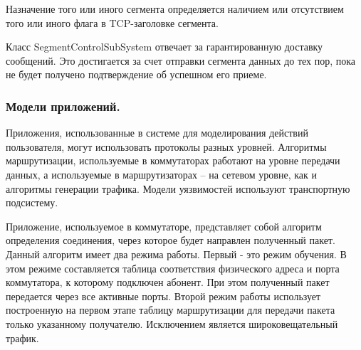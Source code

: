     Назначение того или иного сегмента определяется наличием или отсутствием того или иного флага в TCP-заголовке сегмента.

    Класс SegmentControlSubSystem отвечает за гарантированную доставку сообщений. Это достигается за счет отправки сегмента данных до тех пор, пока не будет получено подтверждение об успешном его приеме.

    \subsubsection{Модели приложений.}

    Приложения, использованные в системе для моделирования действий пользователя, могут использовать протоколы разных уровней. Алгоритмы маршрутизации, используемые в коммутаторах работают на уровне передачи данных, а используемые в маршрутизаторах -- на сетевом уровне, как и алгоритмы генерации трафика. Модели уязвимостей используют транспортную подсистему.

    Приложение, используемое в коммутаторе, представляет собой алгоритм определения соединения, через которое будет направлен полученный пакет. Данный алгоритм имеет два режима работы. Первый - это режим обучения. В этом режиме составляется таблица соответствия физического адреса и порта коммутатора, к которому подключен абонент. При этом полученный пакет передается через все активные порты. Второй режим работы использует построенную на первом этапе таблицу маршрутизации для передачи пакета только указанному получателю. Исключением является широковещательный трафик.

